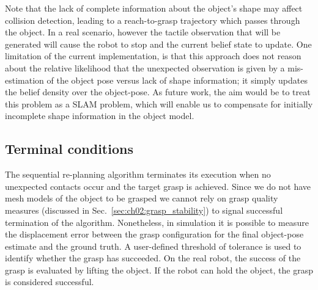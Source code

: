 Note that the lack of complete information about the object's shape may affect collision detection, leading to a reach-to-grasp trajectory which passes through the object. In a real scenario, however the tactile observation that will be generated will cause the robot to stop and the current belief state to update. One limitation of the current implementation, is that this approach does not reason about the relative likelihood that the unexpected observation is given by a mis-estimation of the object pose versus lack of shape information; it simply updates the belief density over the object-pose. As future work,  the aim would be to treat this problem as a SLAM problem, which will enable us to compensate for initially incomplete shape information in the object model. 


\subsection{Terminal conditions}

The sequential re-planning algorithm terminates its execution when no unexpected contacts occur and the target grasp is achieved. Since we do not have mesh models of the object to be grasped we cannot rely on grasp quality measures (discussed in Sec.~\ref{sec:ch02:grasp_stability}) to signal successful termination of the algorithm. Nonetheless, in simulation it is possible to measure the displacement error between the grasp configuration for the final object-pose estimate and the ground truth. A user-defined threshold of tolerance is used to identify whether the grasp has succeeded. On the real robot, the success of the grasp is evaluated by lifting the object. If the robot can hold the object, the grasp is considered successful.


